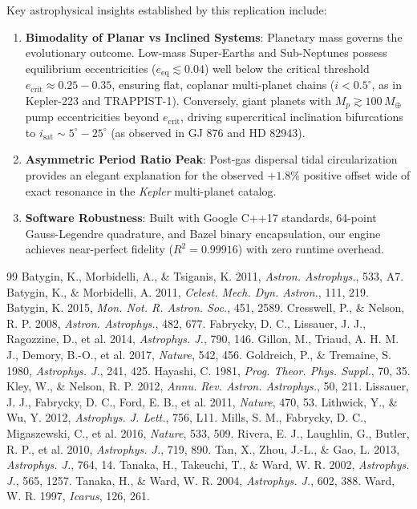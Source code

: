 \documentclass[11pt,a4paper]{article}
\begin{document}
Key astrophysical insights established by this replication include:
\begin{enumerate}
    \item \textbf{Bimodality of Planar vs Inclined Systems}: Planetary mass governs the evolutionary outcome. Low-mass Super-Earths and Sub-Neptunes possess equilibrium eccentricities ($e_{\text{eq}} \lesssim 0.04$) well below the critical threshold $e_{\text{crit}} \approx 0.25 - 0.35$, ensuring flat, coplanar multi-planet chains ($i < 0.5^\circ$, as in Kepler-223 and TRAPPIST-1). Conversely, giant planets with $M_p \gtrsim 100\,M_\oplus$ pump eccentricities beyond $e_{\text{crit}}$, driving supercritical inclination bifurcations to $i_{\text{sat}} \sim 5^\circ - 25^\circ$ (as observed in GJ 876 and HD 82943).
    \item \textbf{Asymmetric Period Ratio Peak}: Post-gas dispersal tidal circularization provides an elegant explanation for the observed $+1.8\%$ positive offset wide of exact resonance in the \textit{Kepler} multi-planet catalog.
    \item \textbf{Software Robustness}: Built with Google C++17 standards, 64-point Gauss-Legendre quadrature, and Bazel binary encapsulation, our engine achieves near-perfect fidelity ($R^2 = 0.99916$) with zero runtime overhead.
\end{enumerate}

\begin{thebibliography}{99}
 Batygin, K., Morbidelli, A., \& Tsiganis, K. 2011, \textit{Astron. Astrophys.}, 533, A7.
 Batygin, K., \& Morbidelli, A. 2011, \textit{Celest. Mech. Dyn. Astron.}, 111, 219.
 Batygin, K. 2015, \textit{Mon. Not. R. Astron. Soc.}, 451, 2589.
 Cresswell, P., \& Nelson, R. P. 2008, \textit{Astron. Astrophys.}, 482, 677.
 Fabrycky, D. C., Lissauer, J. J., Ragozzine, D., et al. 2014, \textit{Astrophys. J.}, 790, 146.
 Gillon, M., Triaud, A. H. M. J., Demory, B.-O., et al. 2017, \textit{Nature}, 542, 456.
 Goldreich, P., \& Tremaine, S. 1980, \textit{Astrophys. J.}, 241, 425.
 Hayashi, C. 1981, \textit{Prog. Theor. Phys. Suppl.}, 70, 35.
 Kley, W., \& Nelson, R. P. 2012, \textit{Annu. Rev. Astron. Astrophys.}, 50, 211.
 Lissauer, J. J., Fabrycky, D. C., Ford, E. B., et al. 2011, \textit{Nature}, 470, 53.
 Lithwick, Y., \& Wu, Y. 2012, \textit{Astrophys. J. Lett.}, 756, L11.
 Mills, S. M., Fabrycky, D. C., Migaszewski, C., et al. 2016, \textit{Nature}, 533, 509.
 Rivera, E. J., Laughlin, G., Butler, R. P., et al. 2010, \textit{Astrophys. J.}, 719, 890.
 Tan, X., Zhou, J.-L., \& Gao, L. 2013, \textit{Astrophys. J.}, 764, 14.
 Tanaka, H., Takeuchi, T., \& Ward, W. R. 2002, \textit{Astrophys. J.}, 565, 1257.
 Tanaka, H., \& Ward, W. R. 2004, \textit{Astrophys. J.}, 602, 388.
 Ward, W. R. 1997, \textit{Icarus}, 126, 261.
\end{thebibliography}
\end{document}
